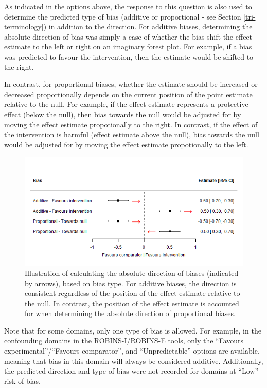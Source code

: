 \documentclass[a4paper, twoside]{templates/ociamthesis}
\begin{document}
As indicated in the options above, the response to this question is also used to determine the predicted type of bias (additive or proportional - see Section \ref{tri-terminology}) in addition to the direction. For additive biases, determining the absolute direction of bias was simply a case of whether the bias shift the effect estimate to the left or right on an imaginary forest plot. For example, if a bias was predicted to favour the intervention, then the estimate would be shifted to the right.

In contrast, for proportional biases, whether the estimate should be increased or decreased proportionally depends on the current position of the point estimate relative to the null. For example, if the effect estimate represents a protective effect (below the null), then bias towards the null would be adjusted for by moving the effect estimate propotionally to the right. In contrast, if the effect of the intervention is harmful (effect estimate above the null), bias towards the null would be adjusted for by moving the effect estimate propotionally to the left.





\begin{figure}[H]
\includegraphics[width=1\linewidth]{figures/tri/exampleDirection} \caption[Illustration of calculating the absolute direction of biases, based on bias type.]{Illustration of calculating the absolute direction of biases (indicated by arrows), based on bias type. For additive biases, the direction is consistent regardless of the position of the effect estimate relative to the null. In contrast, the position of the effect estimate is accounted for when determining the absolute direction of proportional biases.}\label{fig:exampleDirection}
\end{figure}

Note that for some domains, only one type of bias is allowed. For example, in the confounding domains in the ROBINS-I/ROBINS-E tools, only the ``Favours experimental''/``Favours comparator'', and ``Unpredictable'' options are available, meaning that bias in this domain will always be considered additive. Additionally, the predicted direction and type of bias were not recorded for domains at ``Low'' risk of bias.
\end{document}
